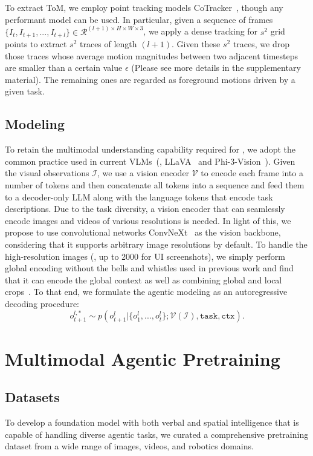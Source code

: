 To extract ToM, we employ point tracking models CoTracker~\cite{karaev2023cotracker}, though any performant model can be used. In particular, given a sequence of frames $\{I_t,I_{t+1},...,I_{t+l}\} \in \mathcal{R}^{(l+1) \times H\times W \times 3}$, we apply a dense tracking for $s^2$ grid points to extract $s^2$ traces of length $(l+1)$. Given these $s^2$ traces, we drop those traces whose average motion magnitudes between two adjacent timesteps are smaller than a certain value $\epsilon$ (Please see more details in the supplementary material). The remaining ones are regarded as foreground motions driven by a given task.

\subsection{Modeling}

To retain the multimodal understanding capability required for \magma, we adopt the common practice used in current VLMs~(\eg, LLaVA~\cite{liu2023llava} and Phi-3-Vision~\cite{abdin2024phi3}). Given the visual observations $\mathcal{I}$, we use a vision encoder $\mathcal{V}$ to encode each frame into a number of tokens and then concatenate all tokens into a sequence and feed them to a decoder-only LLM along with the language tokens that encode task descriptions. Due to the task diversity, a vision encoder that can seamlessly encode images and videos of various resolutions is needed. In light of this, we propose to use convolutional networks ConvNeXt~\cite{liu2022convnet} as the vision backbone, considering that it supports arbitrary image resolutions by default. To handle the high-resolution images (\eg, up to 2000 for UI screenshots), we simply perform global encoding without the bells and whistles used in previous work and find that it can encode the global context as well as combining global and local crops~\cite{liu2024llavanext,abdin2024phi3}. 
To that end, we formulate the agentic modeling as an autoregressive decoding procedure:
\begin{equation}
    o^{l,*}_{t+1} \sim p(o_{t+1}^l | \{o_1^l,...,o_t^l\};  \mathcal{V}(\mathcal{I}), \texttt{task}, \texttt{ctx}).
\end{equation}

\section{Multimodal Agentic Pretraining}

\subsection{Datasets}
\label{sec:pretraining_data}
To develop a foundation model with both verbal and spatial intelligence that is capable of handling diverse agentic tasks, we curated a comprehensive pretraining dataset from a wide range of images, videos, and robotics domains.

